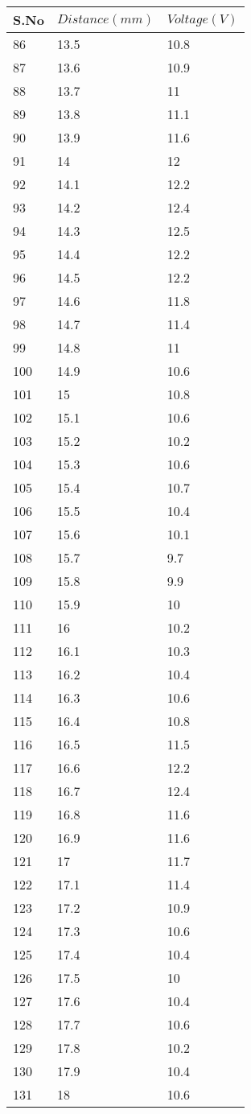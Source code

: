 \documentclass[
	letterpaper, %
	10pt, %
]{CSUniSchoolLabReport}
\begin{document}
\begin{center}
	\begin{tabular}{ | m{1cm} | m{3cm}| m{3cm} | } 
		\hline
		S.No	&	\(Distance (mm)\)	&	\(Voltage (V)\) \\
		\hline
86&13.5&10.8\\
87&13.6&10.9\\
88&13.7&11\\
89&13.8&11.1\\
90&13.9&11.6\\
91&14&12\\
92&14.1&12.2\\
93&14.2&12.4\\
94&14.3&12.5\\
95&14.4&12.2\\
96&14.5&12.2\\
97&14.6&11.8\\
98&14.7&11.4\\
99&14.8&11\\
100&14.9&10.6\\
101&15&10.8\\
102&15.1&10.6\\
103&15.2&10.2\\
104&15.3&10.6\\
105&15.4&10.7\\
106&15.5&10.4\\
107&15.6&10.1\\
108&15.7&9.7\\
109&15.8&9.9\\
110&15.9&10\\
111&16&10.2\\
112&16.1&10.3\\
113&16.2&10.4\\
114&16.3&10.6\\
115&16.4&10.8\\
116&16.5&11.5\\
117&16.6&12.2\\
118&16.7&12.4\\
119&16.8&11.6\\
120&16.9&11.6\\
121&17&11.7\\
122&17.1&11.4\\
123&17.2&10.9\\
124&17.3&10.6\\
125&17.4&10.4\\
126&17.5&10\\
127&17.6&10.4\\
128&17.7&10.6\\
129&17.8&10.2\\
130&17.9&10.4\\
131&18&10.6\\
\hline
	\end{tabular}
\end{center}
\end{document}
